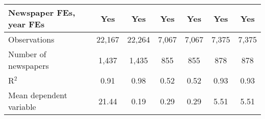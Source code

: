 {\begin{tabular}{l*{6}{c}}
\addlinespace
Newspaper FEs, year FEs &         Yes         &         Yes         &         Yes         &         Yes         &         Yes         &         Yes         \\
\midrule
Observations        &      22,167         &      22,264         &       7,067         &       7,067         &       7,375         &       7,375         \\
Number of newspapers&       1,437         &       1,435         &         855         &         855         &         878         &         878         \\
R$^2$               &        0.91         &        0.98         &        0.52         &        0.52         &        0.93         &        0.93         \\
Mean dependent variable&       21.44         &        0.19         &        0.29         &        0.29         &        5.51         &        5.51         \\
\bottomrule
\end{tabular}
}
